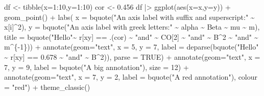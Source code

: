 \documentclass[
  letterpaper,
  DIV=11,
  numbers=noendperiod]{scrreprt}
\newenvironment{Shaded}{\begin{snugshade}}{\end{snugshade}}
\newcommand{\AttributeTok}[1]{\textcolor[rgb]{0.40,0.45,0.13}{#1}}
\newcommand{\ConstantTok}[1]{\textcolor[rgb]{0.56,0.35,0.01}{#1}}
\newcommand{\DecValTok}[1]{\textcolor[rgb]{0.68,0.00,0.00}{#1}}
\newcommand{\FloatTok}[1]{\textcolor[rgb]{0.68,0.00,0.00}{#1}}
\newcommand{\FunctionTok}[1]{\textcolor[rgb]{0.28,0.35,0.67}{#1}}
\newcommand{\NormalTok}[1]{\textcolor[rgb]{0.00,0.23,0.31}{#1}}
\newcommand{\OtherTok}[1]{\textcolor[rgb]{0.00,0.23,0.31}{#1}}
\newcommand{\SpecialCharTok}[1]{\textcolor[rgb]{0.37,0.37,0.37}{#1}}
\newcommand{\StringTok}[1]{\textcolor[rgb]{0.13,0.47,0.30}{#1}}
\begin{document}
\begin{Shaded}
\begin{Highlighting}[]
\NormalTok{df }\OtherTok{\textless{}{-}} \FunctionTok{tibble}\NormalTok{(}\AttributeTok{x=}\DecValTok{1}\SpecialCharTok{:}\DecValTok{10}\NormalTok{,}\AttributeTok{y=}\DecValTok{1}\SpecialCharTok{:}\DecValTok{10}\NormalTok{)}
\NormalTok{cor }\OtherTok{\textless{}{-}} \FloatTok{0.456}
\NormalTok{df }\SpecialCharTok{|\textgreater{}}
  \FunctionTok{ggplot}\NormalTok{(}\FunctionTok{aes}\NormalTok{(}\AttributeTok{x=}\NormalTok{x,}\AttributeTok{y=}\NormalTok{y)) }\SpecialCharTok{+}
  \FunctionTok{geom\_point}\NormalTok{() }\SpecialCharTok{+}
  \FunctionTok{labs}\NormalTok{( }\AttributeTok{x =} \FunctionTok{bquote}\NormalTok{(}\StringTok{"An axis label with suffix and superscript:"} \SpecialCharTok{\textasciitilde{}}\NormalTok{ x[i]}\SpecialCharTok{\^{}}\DecValTok{2}\NormalTok{), }
        \AttributeTok{y =} \FunctionTok{bquote}\NormalTok{(}\StringTok{"An axis label with greek letters:"} \SpecialCharTok{\textasciitilde{}}\NormalTok{ alpha }\SpecialCharTok{\textasciitilde{}}\NormalTok{ Beta }\SpecialCharTok{\textasciitilde{}}\NormalTok{ mu }\SpecialCharTok{\textasciitilde{}}\NormalTok{ m),}
        \AttributeTok{title =} \FunctionTok{bquote}\NormalTok{(}\StringTok{"Hello"}\SpecialCharTok{\textasciitilde{}}\NormalTok{ r[xy] }\SpecialCharTok{==}\NormalTok{ .(cor) }\SpecialCharTok{\textasciitilde{}} \StringTok{"and"} \SpecialCharTok{\textasciitilde{}}\NormalTok{ CO[}\DecValTok{2}\NormalTok{] }\SpecialCharTok{\textasciitilde{}} \StringTok{"and"} \SpecialCharTok{\textasciitilde{}}\NormalTok{ B}\SpecialCharTok{\^{}}\DecValTok{2} \SpecialCharTok{\textasciitilde{}} \StringTok{"and"} \SpecialCharTok{\textasciitilde{}}\NormalTok{ m}\SpecialCharTok{\^{}}\NormalTok{\{}\SpecialCharTok{{-}}\DecValTok{1}\NormalTok{\})) }\SpecialCharTok{+}
  \FunctionTok{annotate}\NormalTok{(}\AttributeTok{geom=}\StringTok{"text"}\NormalTok{, }\AttributeTok{x =} \DecValTok{5}\NormalTok{, }\AttributeTok{y =} \DecValTok{7}\NormalTok{, }\AttributeTok{label =}  \FunctionTok{deparse}\NormalTok{(}\FunctionTok{bquote}\NormalTok{(}\StringTok{"Hello"} \SpecialCharTok{\textasciitilde{}}\NormalTok{ r[xy] }\SpecialCharTok{==} \FloatTok{0.678} \SpecialCharTok{\textasciitilde{}} \StringTok{"and"} \SpecialCharTok{\textasciitilde{}}\NormalTok{ B}\SpecialCharTok{\^{}}\DecValTok{2}\NormalTok{)), }\AttributeTok{parse =} \ConstantTok{TRUE}\NormalTok{) }\SpecialCharTok{+}
  \FunctionTok{annotate}\NormalTok{(}\AttributeTok{geom=}\StringTok{"text"}\NormalTok{, }\AttributeTok{x =} \DecValTok{7}\NormalTok{, }\AttributeTok{y =} \DecValTok{9}\NormalTok{, }\AttributeTok{label =}  \FunctionTok{bquote}\NormalTok{(}\StringTok{"A big annotation"}\NormalTok{), }\AttributeTok{size =} \DecValTok{12}\NormalTok{) }\SpecialCharTok{+}
  \FunctionTok{annotate}\NormalTok{(}\AttributeTok{geom=}\StringTok{"text"}\NormalTok{, }\AttributeTok{x =} \DecValTok{7}\NormalTok{, }\AttributeTok{y =} \DecValTok{2}\NormalTok{, }\AttributeTok{label =}  \FunctionTok{bquote}\NormalTok{(}\StringTok{"A red annotation"}\NormalTok{), }\AttributeTok{colour =} \StringTok{"red"}\NormalTok{) }\SpecialCharTok{+}
  \FunctionTok{theme\_classic}\NormalTok{()}
\end{Highlighting}
\end{Shaded}
\end{document}
